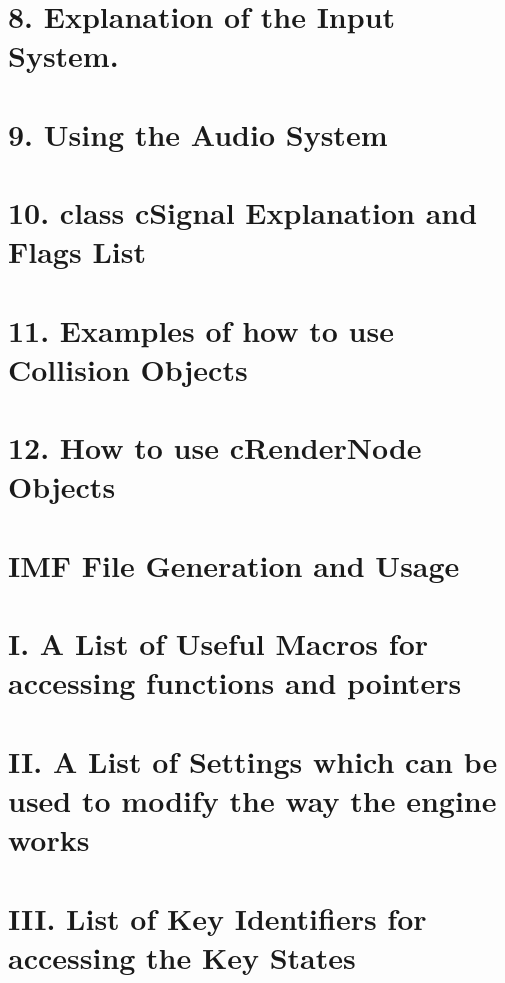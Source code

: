 \documentclass[a4paper]{book}
\begin{document}
\chapter{8. Explanation of the Input System.}
\label{InputSystemExplanation}
\hypertarget{InputSystemExplanation}{}

\chapter{9. Using the Audio System}
\label{Audio}
\hypertarget{Audio}{}

\chapter{10. class cSignal Explanation and Flags List}
\label{SignalExplanation}
\hypertarget{SignalExplanation}{}

\chapter{11. Examples of how to use Collision Objects}
\label{CollisionObjectExamples}
\hypertarget{CollisionObjectExamples}{}

\chapter{12. How to use cRenderNode Objects}
\label{RenderNodeExplanation}
\hypertarget{RenderNodeExplanation}{}

\chapter{IMF File Generation and Usage}
\label{IMFFiles}
\hypertarget{IMFFiles}{}

\chapter{I. A List of Useful Macros for accessing functions and pointers}
\label{MacroList}
\hypertarget{MacroList}{}

\chapter{II. A List of Settings which can be used to modify the way the engine works}
\label{SettingsList}
\hypertarget{SettingsList}{}

\chapter{III. List of Key Identifiers for accessing the Key States}
\label{KeyIdentifiersList}
\hypertarget{KeyIdentifiersList}{}

\end{document}
